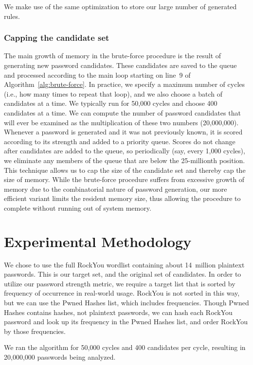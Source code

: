 \documentclass[letterpaper,twocolumn,10pt]{article}
\begin{document}
We make use of the same optimization to store our large number of generated rules.

\subsubsection{Capping the candidate set}

The main growth of memory in the brute-force procedure is the result of
generating new password candidates. These candidates are saved to the queue and
processed according to the main loop starting on line~9 of
Algorithm~\ref{alg:brute-force}. In practice, we specify a maximum number of
cycles (i.e., how many times to repeat that loop), and we also choose a batch
of candidates at a time. We typically run for 50,000 cycles and choose 400
candidates at a time. We can compute the number of password candidates that
will ever be examined as the multiplication of these two numbers (20,000,000).
Whenever a password is generated and it was not previously known, it is scored
according to its strength and added to a priority queue. Scores do not change
after candidates are added to the queue, so periodically (say, every 1,000
cycles), we eliminate any members of the queue that are below the 25-millionth
position. This technique allows us to cap the size of the candidate set and
thereby cap the size of memory. While the brute-force procedure suffers from
excessive growth of memory due to the combinatorial nature of password
generation, our more efficient variant limits the resident memory size, thus
allowing the procedure to complete without running out of system memory.

\section{Experimental Methodology}

We chose to use the full RockYou wordlist containing about 14~million plaintext
passwords. This is our target set, and the original set of candidates. In order
to utilize our password strength metric, we require a target list that is
sorted by frequency of occurrence in real-world usage. RockYou is not sorted in
this way, but we can use the Pwned Hashes list, which includes frequencies.
Though Pwned Hashes contains hashes, not plaintext passwords, we can hash each
RockYou password and look up its frequency in the Pwned Hashes list, and order
RockYou by those frequencies.

We ran the algorithm for 50,000 cycles and 400 candidates per cycle, resulting
in 20,000,000 passwords being analyzed.
\end{document}
